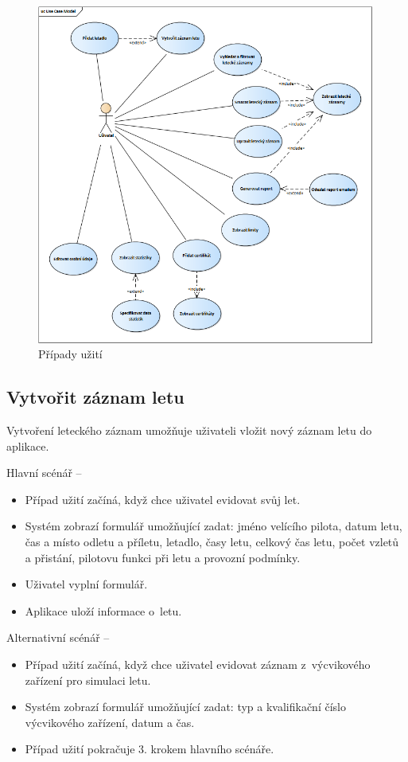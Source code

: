 \documentclass[thesis=M,czech]{FITthesis}[2012/06/26]
\begin{document}
\begin{figure}[]\centering
 \includegraphics[width=0.99\textwidth]{./pictures/UC/UC}
 \caption[Případy užití]{Případy užití}\label{fig:UC}
\end{figure}

\subsection{Vytvořit záznam letu}
Vytvoření leteckého záznam umožňuje uživateli vložit nový záznam letu do aplikace.

Hlavní scénář --
\begin{itemize}
\item Případ užití začíná, když chce uživatel evidovat svůj let.
\item Systém zobrazí formulář umožňující zadat: jméno velícího pilota, datum letu, čas a místo odletu a příletu, letadlo, časy letu, celkový čas letu, počet vzletů a přistání, pilotovu funkci při letu a provozní podmínky.
\item Uživatel vyplní formulář.
\item Aplikace uloží informace o~letu.
\end{itemize}

Alternativní scénář --
\begin{itemize}
\item Případ užití začíná, když chce uživatel evidovat záznam z~výcvikového zařízení pro simulaci letu.
\item Systém zobrazí formulář umožňující zadat: typ a kvalifikační číslo výcvikového zařízení, datum a čas.
\item Případ užití pokračuje 3. krokem hlavního scénáře.
\end{itemize}
\end{document}
